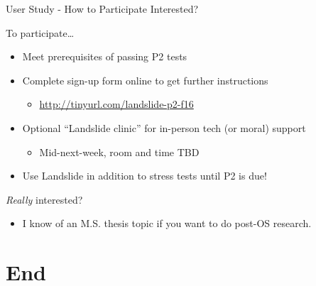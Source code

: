 \documentclass[xcolor=dvipsnames]{beamer}
\begin{document}
\begin{frame}{User Study - How to Participate}
	Interested?
	\linegap

	To participate\dots
	\begin{itemize}
		\item Meet prerequisites of passing P2 tests
		\item Complete sign-up form online to get further instructions
			\begin{itemize}
				\item \url{http://tinyurl.com/landslide-p2-f16}
			\end{itemize}
		\item Optional ``Landslide clinic'' for in-person tech (or moral) support
			\begin{itemize}
				\item Mid-next-week, room and time TBD
			\end{itemize}
		\item Use Landslide in addition to stress tests until P2 is due!
	\end{itemize}
	\linegap

	{\em Really} interested?
	\begin{itemize}
		\item I know of an M.S. thesis topic if you want to do post-OS research.
	\end{itemize}
\end{frame}


\section{End}

\end{document}
